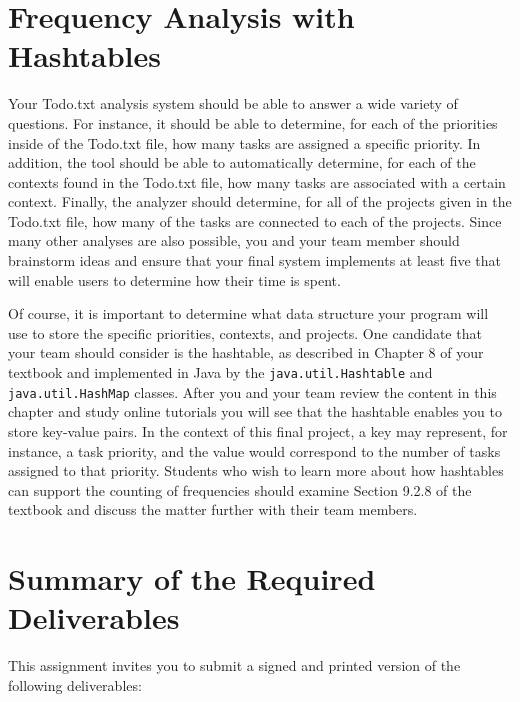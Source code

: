 \section*{Frequency Analysis with Hashtables}

  Your Todo.txt analysis system should be able to answer a wide variety of questions. For instance, it should be able to
  determine, for each of the priorities inside of the Todo.txt file, how many tasks are assigned a specific priority.
  In addition, the tool should be able to automatically determine, for each of the contexts found in the Todo.txt file,
  how many tasks are associated with a certain context. Finally, the analyzer should determine, for all of the projects
  given in the Todo.txt file, how many of the tasks are connected to each of the projects. Since many other analyses are
  also possible, you and your team member should brainstorm ideas and ensure that your final system implements at least
  five that will enable users to determine how their time is spent.

  Of course, it is important to determine what data structure your program will use to store the specific priorities,
  contexts, and projects.  One candidate that your team should consider is the hashtable, as described in Chapter 8 of
  your textbook and implemented in Java by the {\tt java.util.Hashtable} and {\tt java.util.HashMap} classes. After you
  and your team review the content in this chapter and study online tutorials you will see that the hashtable enables
  you to store key-value pairs.  In the context of this final project, a key may represent, for instance, a task
  priority, and the value would correspond to the number of tasks assigned to that priority. Students who wish to
  learn more about how hashtables can support the counting of frequencies should examine Section 9.2.8 of the textbook
  and discuss the matter further with their team members.


\section*{Summary of the Required Deliverables}

  

  This assignment invites you to submit a signed and printed version of the following deliverables: 

